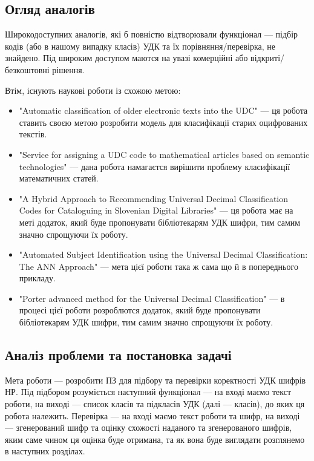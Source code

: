 \documentclass[14pt]{extarticle}
\begin{document}
  \subsection{Огляд аналогів}
  Широкодоступних аналогів, які б повністю відтворювали функціонал ---
  підбір кодів (або в нашому випадку класів) УДК та їх порівняння/перевірка,
  не знайдено. Під широким доступом маются на увазі комерційні
  або відкриті/безкоштовні рішення.

  Втім, існують наукові роботи із схожою метою:
  \begin{itemize}[labelindent=\dimexpr{}\relax, leftmargin=*]
    \item "Automatic classification of older electronic texts into the UDC"
      \cite{kragelj_automatic_udc_classification}
      --- ця робота ставить своєю метою розробити модель для
      класифікації старих оцифрованих текстів.
    
    \item "Service for assigning a UDC code
	    to mathematical articles based on semantic technologies"
      \cite{almukhametov_udc_code_for_math_articles} --- 
      дана робота намагаєтся вирішити проблему класифікації математичних статей.
    
    \item "A Hybrid Approach to Recommending
      Universal Decimal Classification Codes
      for Cataloguing in Slovenian Digital Libraries"
      \cite{borovic_hybrid_udc_recommendation} ---
      ця робота має на меті додаток,
      який буде пропонувати бібліотекарям УДК шифри,
      тим самим значно спрощуючи їх роботу.

    \item "Automated Subject Identification using the
      Universal Decimal Classification: The ANN Approach"
      \cite{roy_ann_approach} ---
      мета цієї роботи така ж сама що й в попереднього прикладу.

    \item "Porter advanced method for the Universal Decimal Classification"
      \cite{tretyakov_porter} --- 
      в процесі цієї роботи розроблются додаток,
      який буде пропонувати бібліотекарям УДК шифри,
      тим самим значно спрощуючи їх роботу.

  \end{itemize}

  \subsection{Аналіз проблеми та постановка задачі}
  Мета роботи ---
  розробити ПЗ для підбору та перевірки коректності УДК шифрів НР.
  Під підбором розуміється наступний функціонал --- на вході маємо текст роботи,
  на виході --- список класів та підкласів УДК (далі --- класів),
  до яких ця робота належить.
  Перевірка --- на вході маємо текст роботи та шифр,
  на виході --- згенерований шифр та оцінку схожості наданого
  та згенерованого шифрів, яким саме чином ця оцінка буде отримана,
  та як вона буде виглядати розглянемо в наступних розділах.
  
\end{document}
